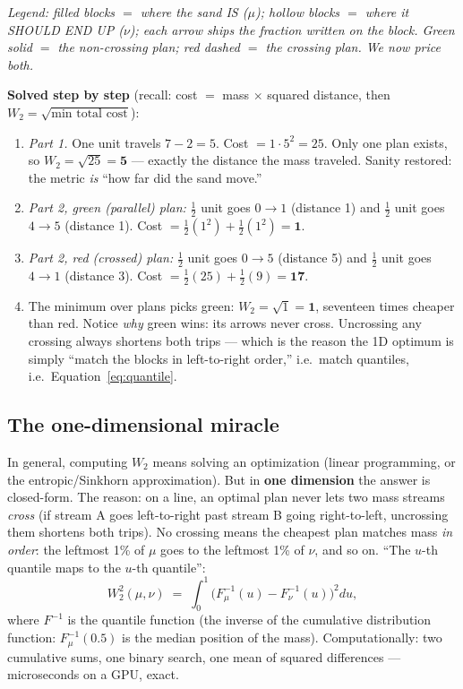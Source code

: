 \documentclass[11pt,a4paper]{article}
\begin{document}
\begin{worked}
\begin{center}
{\scriptsize\emph{Legend: filled blocks $=$ where the sand IS ($\mu$); hollow
blocks $=$ where it SHOULD END UP ($\nu$); each arrow ships the fraction
written on the block. Green solid $=$ the non-crossing plan; red dashed $=$
the crossing plan. We now price both.}}
\end{center}

\textbf{Solved step by step} (recall: cost $=$ mass $\times$ squared distance,
then $W_2 = \sqrt{\text{min total cost}}$):
\begin{enumerate}[leftmargin=6mm, itemsep=0mm]
\item \emph{Part 1.} One unit travels $7-2 = 5$. Cost $= 1 \cdot 5^2 = 25$.
Only one plan exists, so $W_2 = \sqrt{25} = \mathbf{5}$ --- exactly the
distance the mass traveled. Sanity restored: the metric \emph{is} ``how far
did the sand move.''
\item \emph{Part 2, green (parallel) plan:} $\tfrac12$ unit goes $0 \to 1$
(distance 1) and $\tfrac12$ unit goes $4 \to 5$ (distance 1). Cost
$= \tfrac12(1^2) + \tfrac12(1^2) = \mathbf{1}$.
\item \emph{Part 2, red (crossed) plan:} $\tfrac12$ unit goes $0 \to 5$
(distance 5) and $\tfrac12$ unit goes $4 \to 1$ (distance 3). Cost
$= \tfrac12(25) + \tfrac12(9) = \mathbf{17}$.
\item The minimum over plans picks green: $W_2 = \sqrt{1} = \mathbf{1}$,
seventeen times cheaper than red. Notice \emph{why} green wins: its arrows
never cross. Uncrossing any crossing always shortens both trips --- which is
the reason the 1D optimum is simply ``match the blocks in left-to-right
order,'' i.e.\ match quantiles, i.e.\ Equation~\eqref{eq:quantile}.
\end{enumerate}
\end{worked}

\subsection{The one-dimensional miracle}
\label{sec:1dw2}

In general, computing $W_2$ means solving an optimization (linear programming, or
the entropic/Sinkhorn approximation). But in \textbf{one dimension} the answer is
closed-form. The reason: on a line, an optimal plan never lets two mass streams
\emph{cross} (if stream A goes left-to-right past stream B going right-to-left,
uncrossing them shortens both trips). No crossing means the cheapest plan matches
mass \emph{in order}: the leftmost 1\% of $\mu$ goes to the leftmost 1\% of
$\nu$, and so on. ``The $u$-th quantile maps to the $u$-th quantile'':
\begin{equation}
W_2^2(\mu, \nu) \;=\; \int_0^1 \big( F_\mu^{-1}(u) - F_\nu^{-1}(u) \big)^2 du,
\label{eq:quantile}
\end{equation}
where $F^{-1}$ is the quantile function (the inverse of the cumulative
distribution function: $F_\mu^{-1}(0.5)$ is the median position of the mass).
Computationally: two cumulative sums, one binary search, one mean of squared
differences --- microseconds on a GPU, exact.
\end{document}
